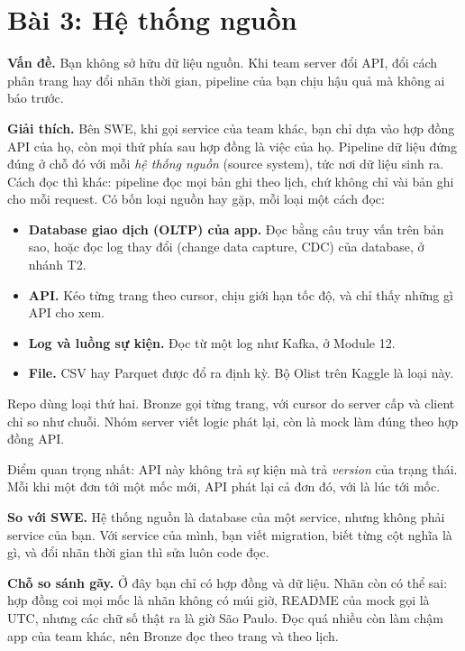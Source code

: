 \section{Bài 3: Hệ thống nguồn}

\textbf{Vấn đề.} Bạn không sở hữu dữ liệu nguồn. Khi team server đổi API, đổi cách phân trang hay đổi nhãn thời gian, pipeline của bạn chịu hậu quả mà không ai báo trước.

\textbf{Giải thích.} Bên SWE, khi gọi service của team khác, bạn chỉ dựa vào hợp đồng API của họ, còn mọi thứ phía sau hợp đồng là việc của họ. Pipeline dữ liệu đứng đúng ở chỗ đó với mỗi \textit{hệ thống nguồn} (source system), tức nơi dữ liệu sinh ra. Cách đọc thì khác: pipeline đọc mọi bản ghi theo lịch, chứ không chỉ vài bản ghi cho mỗi request. Có bốn loại nguồn hay gặp, mỗi loại một cách đọc:

\begin{itemize}
  \item \textbf{Database giao dịch (OLTP) của app.} Đọc bằng câu truy vấn trên bản sao, hoặc đọc log thay đổi (change data capture, CDC) của database, ở nhánh T2.
  \item \textbf{API.} Kéo từng trang theo cursor, chịu giới hạn tốc độ, và chỉ thấy những gì API cho xem.
  \item \textbf{Log và luồng sự kiện.} Đọc từ một log như Kafka, ở Module 12.
  \item \textbf{File.} CSV hay Parquet được đổ ra định kỳ. Bộ Olist trên Kaggle là loại này.
\end{itemize}

Repo dùng loại thứ hai. Bronze gọi  từng trang, với cursor do server cấp và client chỉ so như chuỗi. Nhóm server viết logic phát lại, còn  là mock làm đúng theo hợp đồng API.

Điểm quan trọng nhất: API này không trả sự kiện mà trả \textit{version} của trạng thái. Mỗi khi một đơn tới một mốc mới, API phát lại cả đơn đó, với  là lúc tới mốc.

\begin{ghichu}
\textbf{So với SWE.} Hệ thống nguồn là database của một service, nhưng không phải service của bạn. Với service của mình, bạn viết migration, biết từng cột nghĩa là gì, và đổi nhãn thời gian thì sửa luôn code đọc.

\textbf{Chỗ so sánh gãy.} Ở đây bạn chỉ có hợp đồng và dữ liệu. Nhãn còn có thể sai: hợp đồng coi mọi mốc là nhãn không có múi giờ, README của mock gọi là UTC, nhưng các chữ số thật ra là giờ São Paulo. Đọc quá nhiều còn làm chậm app của team khác, nên Bronze đọc theo trang và theo lịch.
\end{ghichu}

